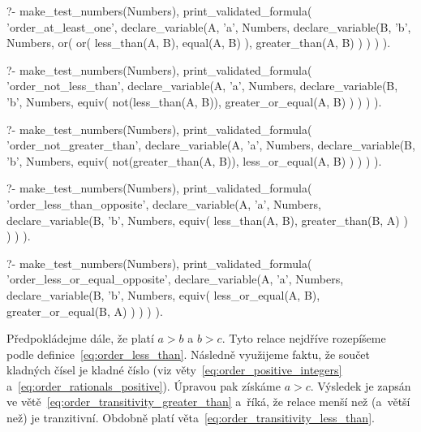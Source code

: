 \begin{fact}
\begin{prolog}
?-	make_test_numbers(Numbers),
	print_validated_formula(
		'order_at_least_one',
		declare_variable(A, 'a', Numbers,
			declare_variable(B, 'b', Numbers,
				or(
					or(
						less_than(A, B),
						equal(A, B)
					),
					greater_than(A, B)
				)
			)
		)
	).
\end{prolog}
\begin{prolog}
?-	make_test_numbers(Numbers),
	print_validated_formula(
		'order_not_less_than',
		declare_variable(A, 'a', Numbers,
			declare_variable(B, 'b', Numbers,
				equiv(
					not(less_than(A, B)),
					greater_or_equal(A, B)
				)
			)
		)
	).
\end{prolog}
\begin{prolog}
?-	make_test_numbers(Numbers),
	print_validated_formula(
		'order_not_greater_than',
		declare_variable(A, 'a', Numbers,
			declare_variable(B, 'b', Numbers,
				equiv(
					not(greater_than(A, B)),
					less_or_equal(A, B)
				)
			)
		)
	).
\end{prolog}
\begin{prolog}
?-	make_test_numbers(Numbers),
	print_validated_formula(
		'order_less_than_opposite',
		declare_variable(A, 'a', Numbers,
			declare_variable(B, 'b', Numbers,
				equiv(
					less_than(A, B),
					greater_than(B, A)
				)
			)
		)
	).
\end{prolog}
\begin{prolog}
?-	make_test_numbers(Numbers),
	print_validated_formula(
		'order_less_or_equal_opposite',
		declare_variable(A, 'a', Numbers,
			declare_variable(B, 'b', Numbers,
				equiv(
					less_or_equal(A, B),
					greater_or_equal(B, A)
				)
			)
		)
	).
\end{prolog}
\end{fact}

Předpokládejme dále, že platí \(a > b\) a \(b > c\). Tyto relace nejdříve rozepíšeme podle definice~\eqref{eq:order_less_than}. Následně využijeme faktu, že součet kladných čísel je kladné číslo (viz věty~\eqref{eq:order_positive_integers} a~\eqref{eq:order_rationals_positive}). Úpravou pak získáme \(a > c\). Výsledek je zapsán ve větě~\eqref{eq:order_transitivity_greater_than} a~říká, že relace menší než (a~větší než) je tranzitivní. Obdobně platí věta~\eqref{eq:order_transitivity_less_than}.

